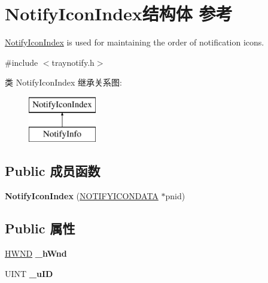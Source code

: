 \hypertarget{struct_notify_icon_index}{}\section{Notify\+Icon\+Index结构体 参考}
\label{struct_notify_icon_index}


\hyperlink{struct_notify_icon_index}{Notify\+Icon\+Index} is used for maintaining the order of notification icons.  




{\ttfamily \#include $<$traynotify.\+h$>$}

类 Notify\+Icon\+Index 继承关系图\+:\begin{figure}[H]
\begin{center}
\leavevmode
\includegraphics[height=2.000000cm]{struct_notify_icon_index}
\end{center}
\end{figure}
\subsection*{Public 成员函数}
\begin{DoxyCompactItemize}
\item 
\mbox{\label{struct_notify_icon_index_a7241c3979df07f5e26624d7ed5998f0c}} 
{\bfseries Notify\+Icon\+Index} (\hyperlink{struct___n_o_t_i_f_y_i_c_o_n_d_a_t_a_a}{N\+O\+T\+I\+F\+Y\+I\+C\+O\+N\+D\+A\+TA} $\ast$pnid)
\end{DoxyCompactItemize}
\subsection*{Public 属性}
\begin{DoxyCompactItemize}
\item 
\mbox{\label{struct_notify_icon_index_ab5228c0b1f7945e2499371ad15849863}} 
\hyperlink{interfacevoid}{H\+W\+ND} {\bfseries \+\_\+h\+Wnd}
\item 
\mbox{\label{struct_notify_icon_index_ae4204522787247437f691900b018f500}} 
U\+I\+NT {\bfseries \+\_\+u\+ID}
\end{DoxyCompactItemize}
